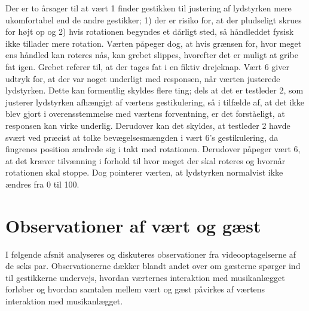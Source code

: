 Der er to årsager til at vært 1 finder gestikken til justering af lydstyrken mere ukomfortabel end de andre gestikker; 1) der er risiko for, at der pludseligt skrues for højt op og 2) hvis rotationen begyndes et dårligt sted, så håndleddet fysisk ikke tillader mere rotation. Værten påpeger dog, at hvis grænsen for, hvor meget ens håndled kan roteres nås, kan grebet slippes, hvorefter det er muligt at gribe fat igen. Grebet referer til, at der tages fat i en fiktiv drejeknap. Vært 6 giver udtryk for, at der var noget underligt med responsen, når værten justerede lydstyrken. Dette kan formentlig skyldes flere ting; dels at det er testleder 2, som justerer lydstyrken afhængigt af værtens gestikulering, så i tilfælde af, at det ikke blev gjort i overensstemmelse med værtens forventning, er det forståeligt, at responsen kan virke underlig. Derudover kan det skyldes, at testleder 2 havde svært ved præcist at tolke bevægelsesmængden i vært 6's gestikulering, da fingrenes position ændrede sig i takt med rotationen. Derudover påpeger vært 6, at det kræver tilvænning i forhold til hvor meget der skal roteres og hvornår rotationen skal stoppe. Dog pointerer værten, at lydstyrken normalvist ikke ændres fra 0 til 100. 
%
\section{Observationer af vært og gæst}
\label{TestresultaterSocialAcceptGestikkerObservationer}
%
I følgende afsnit analyseres og diskuteres observationer fra videooptagelserne af de seks par. Observationerne dækker blandt andet over om gæsterne spørger ind til gestikkerne undervejs, hvordan værternes interaktion med musikanlægget forløber og hvordan samtalen mellem vært og gæst påvirkes af værtens interaktion med musikanlægget.
%
